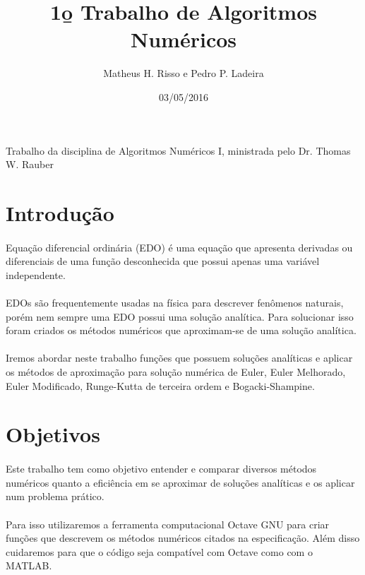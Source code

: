 \documentclass{article}
\title {1\b o Trabalho de Algoritmos Num\'ericos}
\author{Matheus H. Risso e Pedro P. Ladeira}
\date{03/05/2016}
\begin{document}
\maketitle
\begin{enviroment}
\tiny
Trabalho da disciplina de Algoritmos Numéricos I, ministrada pelo Dr. Thomas W. Rauber
\end {enviroment}
\newpage
{}
\renewcommand{\contentsname}{Sum\'ario}
\tableofcontents
\newpage

\section{Introdu\c c\~ao}
\paragraph{}Equa\c c\~ao diferencial ordin\'aria (EDO) \'e uma equa\c c\~ao que apresenta derivadas ou diferenciais de uma fun\c c\~ao desconhecida que
possui apenas uma vari\'avel independente. 
\paragraph{}EDOs s\~ao frequentemente usadas na f\'isica para descrever fen\^omenos naturais, por\'em nem sempre uma EDO possui uma solu\c c\~ao anal\'itica. 
Para solucionar isso foram criados os m\'etodos num\'ericos que aproximam-se de uma solu\c c\~ao anal\'itica. 
\paragraph{}Iremos abordar neste trabalho fun\c c\~oes que possuem solu\c c\~oes anal\'iticas e aplicar os m\'etodos de aproxima\c c\~ao para solu\c c\~ao num\'erica
de Euler, Euler Melhorado, Euler Modificado, Runge-Kutta de terceira ordem e Bogacki-Shampine.
\newpage
\section{Objetivos}
\paragraph{}Este trabalho tem como objetivo entender e comparar diversos m\'etodos num\'ericos quanto a efici\^encia em se aproximar de solu\c c\~oes anal\'iticas e 
os aplicar num problema pr\'atico.
\paragraph{}Para isso utilizaremos a ferramenta computacional Octave GNU para criar fun\c c\~oes que descrevem os m\'etodos num\'ericos citados na especifica\c c\~ao.
Al\'em disso cuidaremos para que o c\'odigo seja compat\'ivel com Octave como com o MATLAB.
\end{document}
